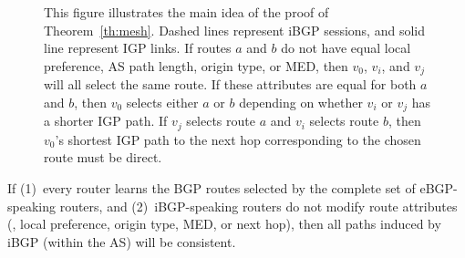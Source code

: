 \begin{figure}
\centering
\begin{psfrags}
%
%
\end{psfrags}
\caption[The main idea of the proof of
  Theorem~\ref{th:mesh}]{This figure illustrates the main idea of the proof of
  Theorem~\ref{th:mesh}.  Dashed lines represent iBGP sessions, and
  solid line represent IGP links.  If routes $a$ and $b$ do not have equal
  local preference, AS path length, origin type, or MED, then $v_0$,
  $v_i$, and $v_j$ will all select the same route.  If these attributes
  are equal for both $a$ and $b$, then $v_0$ selects either $a$ or $b$
  depending on whether $v_i$ or $v_j$ has a shorter IGP path.  If $v_j$
  selects route $a$ and $v_i$ selects route $b$, then $v_0$'s shortest IGP
  path to the next hop corresponding to the chosen route must be direct.}
\label{fig:fm_validity}
\end{figure}


\begin{theorem}\label{th:mesh}
If (1)~every router learns the BGP routes selected by the complete set of
eBGP-speaking routers, and
(2)~iBGP-speaking routers do not modify route attributes (\ie, local
preference, origin type, MED, or next hop), then 
all paths induced by iBGP (within the AS) will be consistent.
\end{theorem}

